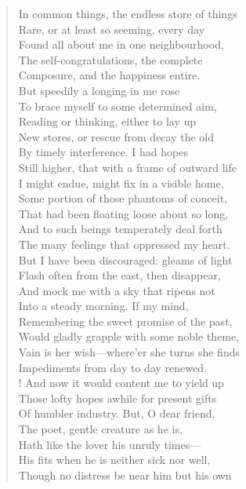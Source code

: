 \begin{verse}
In common things, the endless store of things  \\
Rare, or at least so seeming, every day  \\
Found all about me in one neighbourhood,	  \\
The self-congratulations, the complete  \\
Composure, and the happiness entire.  \\
But speedily a longing in me rose  \\
To brace myself to some determined aim,  \\
Reading or thinking, either to lay up	  \\
New stores, or rescue from decay the old  \\
By timely interference. I had hopes  \\
Still higher, that with a frame of outward life  \\
I might endue, might fix in a visible home,  \\
Some portion of those phantoms of conceit,	  \\
That had been floating loose about so long,  \\
And to such beings temperately deal forth  \\
The many feelings that oppressed my heart.  \\
But I have been discouraged: gleams of light  \\
Flash often from the east, then disappear,	  \\
And mock me with a sky that ripens not  \\
Into a steady morning. If my mind,  \\
Remembering the sweet promise of the past,  \\
Would gladly grapple with some noble theme,  \\
Vain is her wish---where'er she turns she finds	  \\
Impediments from day to day renewed.  \\!
And now it would content me to yield up  \\
Those lofty hopes awhile for present gifts  \\
Of humbler industry. But, O dear friend,  \\
The poet, gentle creature as he is,	  \\
Hath like the lover his unruly times---  \\
His fits when he is neither sick nor well,  \\
Though no distress be near him but his own  \\

\end{verse}
